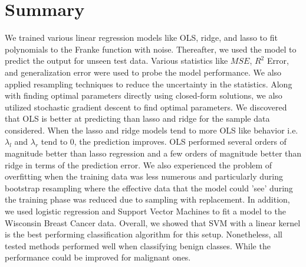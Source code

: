 \section{Summary} \label{sec:summary}

We trained various linear regression models like OLS, ridge, and lasso to fit polynomials to the Franke function with noise. Thereafter, we used the model to predict the output for unseen test data. Various statistics like $MSE$, $R^2$ Error, and generalization error were used to probe the model performance. We also applied resampling techniques to reduce the uncertainty in the statistics. Along with finding optimal parameters directly using closed-form solutions, we also utilized stochastic gradient descent to find optimal parameters. We discovered that OLS is better at predicting than lasso and ridge for the sample data considered. When the lasso and ridge models tend to more OLS like behavior i.e. $\lambda_l$ and $\lambda_r$ tend to 0, the prediction improves. OLS performed several orders of magnitude better than lasso regression and a few orders of magnitude better than ridge in terms of the prediction error. We also experienced the problem of overfitting when the training data was less numerous and particularly during bootstrap resampling where the effective data that the model could 'see' during the training phase was reduced due to sampling with replacement. \newline
In addition, we used logistic regression and Support Vector Machines to fit a model to the Wisconsin Breast Cancer data. Overall, we showed that SVM with a linear kernel is the best performing classification algorithm for this setup. Nonetheless, all tested methods performed well when classifying benign classes. While the performance could be improved for malignant ones.